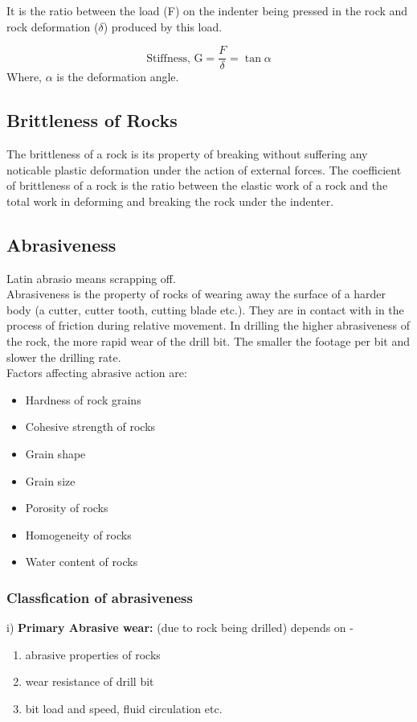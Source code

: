 \documentclass{article}
\begin{document}
\begin{multicols}{2}
  It is the ratio between the load (F) on the indenter being pressed in the rock and rock deformation ($\delta$) produced by this load. 

  $$\text{Stiffness, G} = \frac{F}{\delta} = \tan \alpha$$
  Where, $\alpha$ is the deformation angle. 

  \subsection*{Brittleness of Rocks}
  The brittleness of a rock is its property of breaking without suffering any noticable plastic deformation under the action of external forces. The coefficient of brittleness of a rock is the ratio between the elastic work of a rock and the total work in deforming and breaking the rock under the indenter.
  
  \subsection*{Abrasiveness}
  Latin abrasio means scrapping off. \\
  Abrasiveness is the property of rocks of wearing away the surface of a harder body (a cutter, cutter tooth, cutting blade etc.). They are in contact with in the process of friction during relative movement. In drilling the higher abrasiveness of the rock, the more rapid wear of the drill bit. The smaller the footage per bit and slower the drilling rate. \\
  
  
  Factors affecting abrasive action are:
  \begin{itemize}
    \item Hardness of rock grains
    \item Cohesive strength of rocks
    \item Grain shape 
    \item Grain size
    \item Porosity of rocks
    \item Homogeneity of rocks
    \item Water content of rocks
  \end{itemize}
  \subsubsection*{Classfication of abrasiveness}
  i) \textbf{Primary Abrasive wear:} (due to rock being drilled) depends on - 
  \begin{enumerate}
    \item abrasive properties of rocks 
    \item wear resistance of drill bit 
    \item bit load and speed, fluid circulation etc.
  \end{enumerate}


\end{multicols}
\end{document}
